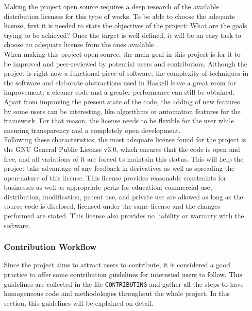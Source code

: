 Making the project open source requires a deep research of the available
distribution licenses for this type of works. To be able to choose the adequate
license, first it is needed to state the objectives of the project: What are the
goals trying to be achieved? Once the target is well defined, it will be an
easy task to choose an adequate license from the ones available
\cite{morin-2012-license}.\\

When making this project open source, the main goal in this project is
for it to be improved and peer-reviewed by potential users and contributors.
Although the project is right now a functional piece of software, the
complexity of techniques in the software and elaborate abstractions used in
Haskell leave a great room for improvement: a cleaner code and a greater
performance can still be obtained. Apart from improving the present state of
the code, the adding of new features by some users can be interesting, like
algorithms or automation features for the framework. For that reason, the
license needs to be flexible for the user while ensuring transparency and a
completely open development.\\

Following these characteristics, the most adequate license found for the
project is the GNU General Public License v3.0, which ensures that the code is
open and free, and all variations of it are forced to maintain this status.
This will help the project take advantage of any feedback in derivatives as
well as spreading the open-nature of this license. This license provides
reasonable constraints for businesses as well as appropriate perks for
education: commercial use, distribution, modification, patent use, and private
use are allowed as long as the source code is disclosed, licensed under the
same license and the changes performed are stated. This license also provides
no liability or warranty with the software.\\

\subsubsection{Contribution Workflow}

Since the project aims to attract users to contribute, it is considered a good
practice to offer some contribution guidelines for interested users to follow.
This guidelines are collected in the file \texttt{CONTRIBUTING} and gather all
the steps to have homogeneous code and methodologies throughout the whole
project. In this section, this guidelines will be explained on detail.\\

